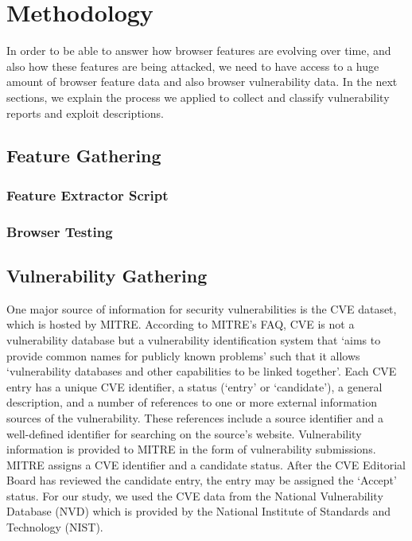 \section{Methodology}
\label{sec:methodology}

In order to be able to answer how browser features are evolving over time, and also how these features are being attacked, we need to have access to a huge amount of browser feature data and also browser vulnerability data. In the next sections, we explain the process
we applied to collect and classify vulnerability reports and exploit descriptions.

\subsection{Feature Gathering}
\subsubsection{Feature Extractor Script}
\subsubsection{Browser Testing}


\subsection{Vulnerability Gathering}
One major source of information for security vulnerabilities is the CVE dataset,
which is hosted by MITRE. According to MITRE’s FAQ, CVE is not
a vulnerability database but a vulnerability identification system that ‘aims to
provide common names for publicly known problems’ such that it allows ‘vulnerability databases and other capabilities to be linked together’. Each CVE entry
has a unique CVE identifier, a status (‘entry’ or ‘candidate’), a general description, and a number of references to one or more external information sources of
the vulnerability. These references include a source identifier and a well-defined
identifier for searching on the source’s website. Vulnerability information is provided to MITRE in the form of vulnerability submissions. MITRE assigns a CVE
identifier and a candidate status. After the CVE Editorial Board has reviewed
the candidate entry, the entry may be assigned the ‘Accept’ status.
For our study, we used the CVE data from the National Vulnerability Database
(NVD) which is provided by the National Institute of Standards and Technology (NIST).